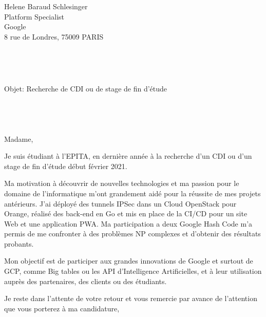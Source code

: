 \documentclass[11pt,a4paper]{letter} %
\def\opening#1{\thispagestyle{empty}
    {\centering\fromaddress \vspace{0.6in} \\ %
    \hspace*{\longindentation}\hspace*{\fill}\par} %
    {\raggedright \toname \\ \toaddress \par} %
    \vspace{0.4in} %
    \noindent #1 %
    }
\begin{document}

    \begin{letter}
        {Helene Baraud Schlesinger\\
        Platform Specialist\\
        Google\\
        8 rue de Londres, 75009 PARIS \\
        }


        \opening{Objet: Recherche de CDI ou de stage de fin d'étude\\
        \\
        \\
        \\
        \\
        Madame,}

        \vspace{0.4in}

        Je suis étudiant à l'EPITA, en dernière année à la recherche d'un CDI ou d'un stage de fin d'étude début février 2021.

        Ma motivation à découvrir de nouvelles technologies et ma passion pour le domaine de l'informatique m'ont grandement aidé pour la réussite de mes projets antérieurs.
        J'ai déployé des tunnels IPSec dans un Cloud OpenStack pour Orange, réalisé des back-end en Go et mis en place de la CI/CD pour un site Web et une application PWA.
        Ma participation a deux Google Hash Code m'a permis de me confronter à des problèmes NP complexes et d'obtenir des résultats probants.

        Mon objectif est de participer aux grandes innovations de Google et surtout de GCP, comme Big tables ou les API d'Intelligence Artificielles, et à leur utilisation auprès des partenaires, des clients ou des étudiants.

        Je reste dans l'attente de votre retour et vous remercie par avance de l'attention que vous porterez à ma candidature,

        \closing{}


    \end{letter}
    
\end{document}
